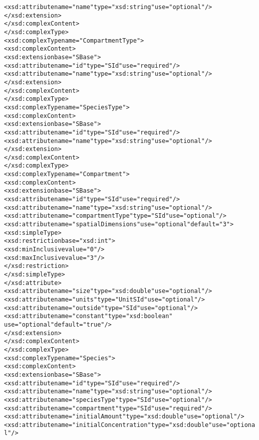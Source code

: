 \begin{alltt}
                <xsd:attribute name="name" type="xsd:string" use="optional"/>
            </xsd:extension>
        </xsd:complexContent>
    </xsd:complexType>
    <xsd:complexType name="CompartmentType">
        <xsd:complexContent>
            <xsd:extension base="SBase">
                <xsd:attribute name="id" type="SId" use="required"/>
                <xsd:attribute name="name" type="xsd:string" use="optional"/>
            </xsd:extension>
        </xsd:complexContent>
    </xsd:complexType>
    <xsd:complexType name="SpeciesType">
        <xsd:complexContent>
            <xsd:extension base="SBase">
                <xsd:attribute name="id" type="SId" use="required"/>
                <xsd:attribute name="name" type="xsd:string" use="optional"/>
            </xsd:extension>
        </xsd:complexContent>
    </xsd:complexType>
    <xsd:complexType name="Compartment">
        <xsd:complexContent>
            <xsd:extension base="SBase">
                <xsd:attribute name="id" type="SId" use="required"/>
                <xsd:attribute name="name" type="xsd:string" use="optional"/>
                <xsd:attribute name="compartmentType" type="SId" use="optional"/>
                <xsd:attribute name="spatialDimensions" use="optional" default="3">
                    <xsd:simpleType>
                        <xsd:restriction base="xsd:int">
                            <xsd:minInclusive value="0"/>
                            <xsd:maxInclusive value="3"/>
                        </xsd:restriction>
                    </xsd:simpleType>
                </xsd:attribute>
                <xsd:attribute name="size" type="xsd:double" use="optional"/>
                <xsd:attribute name="units" type="UnitSId" use="optional"/>
                <xsd:attribute name="outside" type="SId" use="optional"/>
                <xsd:attribute name="constant" type="xsd:boolean" 
                               use="optional" default="true"/>
            </xsd:extension>
        </xsd:complexContent>
    </xsd:complexType>
    <xsd:complexType name="Species">
        <xsd:complexContent>
            <xsd:extension base="SBase">
                <xsd:attribute name="id" type="SId" use="required"/>
                <xsd:attribute name="name" type="xsd:string" use="optional"/>
                <xsd:attribute name="speciesType" type="SId"  use="optional"/>
                <xsd:attribute name="compartment" type="SId" use="required"/>
                <xsd:attribute name="initialAmount" type="xsd:double" use="optional"/>
                <xsd:attribute name="initialConcentration" type="xsd:double" use="optional"/>

\end{alltt}
